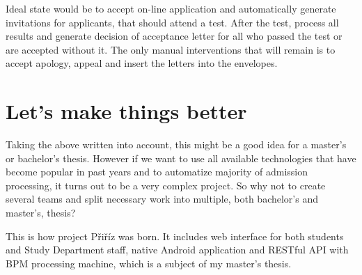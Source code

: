 \begin{introduction}
	Ideal state would be to accept on-line application and automatically generate invitations for applicants, that should
	attend a test. After the test, process all results and generate decision of acceptance letter for all who passed the
	test or are accepted without it. The only manual interventions that will remain is to accept apology, appeal and insert
	the letters into the envelopes.
	
	\section{Let's make things better}
	
	Taking the above written into account, this might be a good idea for a master's or bachelor's thesis. However if we
	want to use all available technologies that have become popular in past years and to automatize majority of admission
	processing, it turns out to be a very complex project. So why not to create several teams and split necessary work into
	multiple, both bachelor's and master's, thesis?
	
	This is how project Přiříz was born. It includes web interface for both students and Study Department staff, native
	Android application and RESTful API with BPM processing machine, which is a subject of my master's thesis.
	 
\end{introduction}